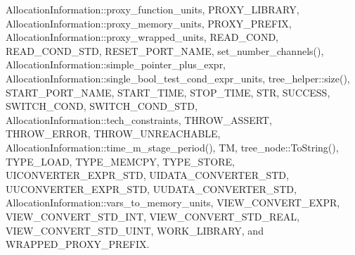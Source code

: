 Allocation\+Information\+::proxy\+\_\+function\+\_\+units, P\+R\+O\+X\+Y\+\_\+\+L\+I\+B\+R\+A\+RY, Allocation\+Information\+::proxy\+\_\+memory\+\_\+units, P\+R\+O\+X\+Y\+\_\+\+P\+R\+E\+F\+IX, Allocation\+Information\+::proxy\+\_\+wrapped\+\_\+units, R\+E\+A\+D\+\_\+\+C\+O\+ND, R\+E\+A\+D\+\_\+\+C\+O\+N\+D\+\_\+\+S\+TD, R\+E\+S\+E\+T\+\_\+\+P\+O\+R\+T\+\_\+\+N\+A\+ME, set\+\_\+number\+\_\+channels(), Allocation\+Information\+::simple\+\_\+pointer\+\_\+plus\+\_\+expr, Allocation\+Information\+::single\+\_\+bool\+\_\+test\+\_\+cond\+\_\+expr\+\_\+units, tree\+\_\+helper\+::size(), S\+T\+A\+R\+T\+\_\+\+P\+O\+R\+T\+\_\+\+N\+A\+ME, S\+T\+A\+R\+T\+\_\+\+T\+I\+ME, S\+T\+O\+P\+\_\+\+T\+I\+ME, S\+TR, S\+U\+C\+C\+E\+SS, S\+W\+I\+T\+C\+H\+\_\+\+C\+O\+ND, S\+W\+I\+T\+C\+H\+\_\+\+C\+O\+N\+D\+\_\+\+S\+TD, Allocation\+Information\+::tech\+\_\+constraints, T\+H\+R\+O\+W\+\_\+\+A\+S\+S\+E\+RT, T\+H\+R\+O\+W\+\_\+\+E\+R\+R\+OR, T\+H\+R\+O\+W\+\_\+\+U\+N\+R\+E\+A\+C\+H\+A\+B\+LE, Allocation\+Information\+::time\+\_\+m\+\_\+stage\+\_\+period(), TM, tree\+\_\+node\+::\+To\+String(), T\+Y\+P\+E\+\_\+\+L\+O\+AD, T\+Y\+P\+E\+\_\+\+M\+E\+M\+C\+PY, T\+Y\+P\+E\+\_\+\+S\+T\+O\+RE, U\+I\+C\+O\+N\+V\+E\+R\+T\+E\+R\+\_\+\+E\+X\+P\+R\+\_\+\+S\+TD, U\+I\+D\+A\+T\+A\+\_\+\+C\+O\+N\+V\+E\+R\+T\+E\+R\+\_\+\+S\+TD, U\+U\+C\+O\+N\+V\+E\+R\+T\+E\+R\+\_\+\+E\+X\+P\+R\+\_\+\+S\+TD, U\+U\+D\+A\+T\+A\+\_\+\+C\+O\+N\+V\+E\+R\+T\+E\+R\+\_\+\+S\+TD, Allocation\+Information\+::vars\+\_\+to\+\_\+memory\+\_\+units, V\+I\+E\+W\+\_\+\+C\+O\+N\+V\+E\+R\+T\+\_\+\+E\+X\+PR, V\+I\+E\+W\+\_\+\+C\+O\+N\+V\+E\+R\+T\+\_\+\+S\+T\+D\+\_\+\+I\+NT, V\+I\+E\+W\+\_\+\+C\+O\+N\+V\+E\+R\+T\+\_\+\+S\+T\+D\+\_\+\+R\+E\+AL, V\+I\+E\+W\+\_\+\+C\+O\+N\+V\+E\+R\+T\+\_\+\+S\+T\+D\+\_\+\+U\+I\+NT, W\+O\+R\+K\+\_\+\+L\+I\+B\+R\+A\+RY, and W\+R\+A\+P\+P\+E\+D\+\_\+\+P\+R\+O\+X\+Y\+\_\+\+P\+R\+E\+F\+IX.

